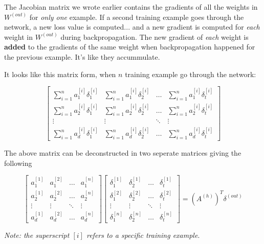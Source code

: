 \documentclass[../main.tex]{subfiles}
\begin{document}
The Jacobian matrix we wrote earlier contains the gradients of all the
weights in $W^{(out)}$ for \emph{only one} example. If a second training example goes 
through the network, a new loss value is computed...  and a new gradient is computed
for \emph{each} weight in $W^{(out)}$ during backpropagation. The new gradient of \emph{each} weight
is \textbf{added} to the gradients of the same weight when backpropagation happened for the previous example.
It's like they accummulate.

\vspace{5mm} %

It looks like this matrix form, when $n$ training example go through the network:

\[
    \begin{bmatrix}
        \sum_{i=1}^{n} a_1^{[i]}\delta_1^{[i]}  & \sum_{i=1}^{n} a_1^{[i]}\delta_2^{[i]} & \dots    & \sum_{i=1}^{n} a_1^{[i]}\delta_t^{[i]} \\
        \sum_{i=1}^{n} a_2^{[i]}\delta_1^{[i]}  & \sum_{i=1}^{n} a_2^{[i]}\delta_2^{[i]} & \dots    & \sum_{i=1}^{n} a_2^{[i]}\delta_t^{[i]} \\
        \vdots                                  & \vdots                                 & \ddots   & \vdots                                 \\
        \sum_{i=1}^{n} a_d^{[i]}\delta_1^{[i]}  & \sum_{i=1}^{n} a_d^{[i]}\delta_2^{[i]} & \dots    & \sum_{i=1}^{n} a_d^{[i]}\delta_t^{[i]}
    \end{bmatrix}
\]

\vspace{5mm} %

The above matrix can be deconstructed in two seperate matrices giving the following

\vspace{5mm} %

\[
    \begin{bmatrix}
        a_1^{[1]}   & a_1^{[2]} & \dots  & a_1^{[n]} \\
        a_2^{[1]}   & a_2^{[2]} & \dots  & a_2^{[n]} \\
        \vdots      & \vdots    & \ddots & \vdots    \\
        a_d^{[1]}   & a_d^{[2]} & \dots  & a_d^{[n]}
    \end{bmatrix}
    \begin{bmatrix}
        \delta_1^{[1]}   & \delta_2^{[1]} & \dots  & \delta_t^{[1]} \\
        \delta_1^{[2]}   & \delta_2^{[2]} & \dots  & \delta_t^{[2]} \\
        \vdots      & \vdots    & \ddots & \vdots    \\
        \delta_1^{[n]}   & \delta_2^{[n]} & \dots  & \delta_t^{[n]} 
    \end{bmatrix}
    =
    (A^{(h)})^T \delta^{(out)}
\]

\emph{Note: the superscript $[i]$ refers to a specific training example}.
\end{document}
